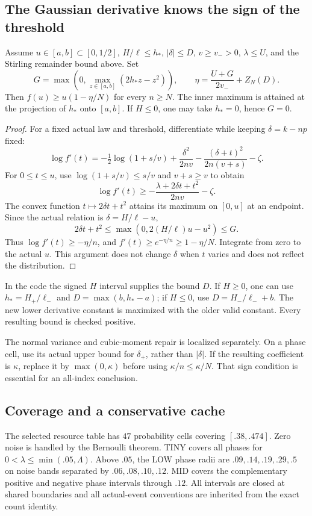 \subsection{The Gaussian derivative knows the sign of the threshold}
\begin{lemma}\label{lem:mid}
Assume $u\in[a,b]\subset[0,1/2]$, $H/\ell\le h_*$, $|\delta|\le D$,
$v\ge v_->0$, $\lambda\le U$, and the Stirling remainder bound above.
Set
\[
 G=\max\left(0,\max_{z\in[a,b]}(2h_*z-z^2)\right),\qquad
 \eta=\frac{U+G}{2v_-}+Z_N(D).
\]
Then $f(u)\ge u(1-\eta/N)$ for every $n\ge N$.
The inner maximum is attained at the projection of $h_*$ onto $[a,b]$.
If $H\le0$, one may take $h_*=0$, hence $G=0$.
\end{lemma}
\begin{proof}
For a fixed actual law and threshold, differentiate while keeping
$\delta=k-np$ fixed:
\[
 \log f'(t)=-\tfrac12\log(1+s/v)
       +\frac{\delta^2}{2nv}-\frac{(\delta+t)^2}{2n(v+s)}-\zeta.
\]
For $0\le t\le u$, use $\log(1+s/v)\le s/v$ and $v+s\ge v$ to obtain
\[
 \log f'(t)\ge-\frac{\lambda+2\delta t+t^2}{2nv}-\zeta.
\]
The convex function $t\mapsto2\delta t+t^2$ attains its maximum on
$[0,u]$ at an endpoint. Since the actual relation is $\delta=H/\ell-u$,
\[
 2\delta t+t^2\le\max(0,2(H/\ell)u-u^2)\le G.
\]
Thus $\log f'(t)\ge-\eta/n$, and
$f'(t)\ge e^{-\eta/n}\ge1-\eta/N$. Integrate from zero to the actual $u$.
This argument does not change $\delta$ when $t$ varies and does not reflect
the distribution.
\end{proof}

In the code the signed $H$ interval supplies the bound $D$. If $H\ge0$,
one can use $h_*=H_+/\ell_-$ and $D=\max(b,h_*-a)$; if $H\le0$,
use $D=H_-/\ell_-+b$. The new lower derivative constant is maximized with
the older valid constant. Every resulting bound is checked positive.

The normal variance and cubic-moment repair is localized separately.
On a phase cell, use its actual upper bound for $\delta_+$, rather than
$|\delta|$. If the resulting coefficient is $\kappa$, replace it by
$\max(0,\kappa)$ before using $\kappa/n\le\kappa/N$.
That sign condition is essential for an all-index conclusion.

\subsection{Coverage and a conservative cache}
The selected resource table has $47$ probability cells covering $[.38,.474]$.
Zero noise is handled by the Bernoulli theorem. TINY covers all phases for
$0<\lambda\le\min(.05,\Lambda)$. Above $.05$, the LOW phase radii are
$.09,.14,.19,.29,.5$ on noise bands separated by $.06,.08,.10,.12$.
MID covers the complementary positive and negative phase intervals through
$.12$. All intervals are closed at shared boundaries and all actual-event
conventions are inherited from the exact count identity.

